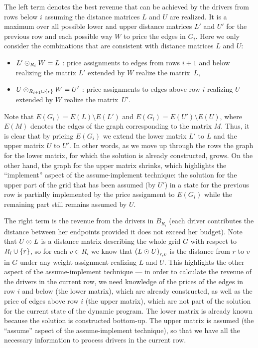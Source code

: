 The left term denotes the best revenue that can be achieved by the
drivers from rows below $i$ assuming the distance matrices $L$ and $U$ are realized.
It is a maximum over all possible lower and upper distance matrices
$L'$ and $U'$ for the previous row and each possible way $W$ to price the edges in $G_i$.
Here we only consider the combinations that are consistent with distance matrices $L$ and $U$:
\begin{itemize}[nosep]
\item $L' \odot_{R_i} W = L$ : price assignments to edges from rows $i+1$ and below realizing the matrix $L'$ extended by $W$ realize the matrix~$L$,
\item $U \odot_{R_{i+1} \cup \left\{ r \right\}} W = U'$ : price assignments to edges above row $i$ realizing $U$ extended by $W$ realize the matrix~$U'$.
\end{itemize}
Note that $E(G_i) = E(L) \setminus E(L')$ and $E(G_i) = E(U') \setminus E(U)$, where $E(M)$ denotes the edges of the graph corresponding to the matrix $M$.
Thus, it is clear that by pricing $E(G_i)$ we extend the lower matrix $L'$ to $L$ and the upper matrix $U$ to $U'$.
In other words, as we move up through the rows the graph for the lower matrix, for which the solution is already constructed, grows.
On the other hand, the graph for the upper matrix shrinks, which highlights the ``implement'' aspect of the assume-implement technique:
the solution for the upper part of the grid that has been assumed (by $U'$) in a state for the previous row
is partially implemented by the price assignment to $E(G_i)$ while the remaining part still remains assumed by $U$.

The right term is the revenue from the drivers in $B_{R_i}$
(each driver contributes the distance between her endpoints provided it does not exceed her budget).
Note that $U \odot_{} \mathit{L}$ is a distance matrix describing the whole grid $G$ with respect to $R_i \cup \left\{ r \right\}$, so
for each $v \in R_i$ we know that $\left( L \odot_{} U \right)_{r, v}$ is the distance from $r$ to $v$ in $G$ under any weight assignment
realizing $L$ and $U$.
This highlights the other aspect of the assume-implement technique ---
in order to calculate the revenue of the drivers in the current row, we need knowledge of
the prices of the edges in row $i$ and below (the lower matrix), which are already constructed,
as well as the price of edges above row $i$ (the upper matrix), which are not part of the solution
for the current state of the dynamic program.
The lower matrix is already known because the solution is constructed bottom-up.
The upper matrix is assumed (the ``assume'' aspect of the assume-implement technique), so that we have
all the necessary information to process drivers in the current row.


